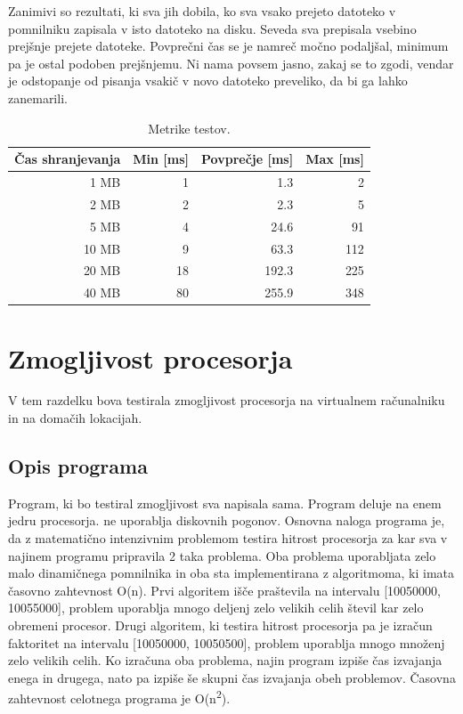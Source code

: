 Zanimivi so rezultati, ki sva jih dobila, ko sva vsako prejeto datoteko v pomnilniku zapisala v isto datoteko na disku. Seveda sva prepisala vsebino prejšnje prejete datoteke. Povprečni čas se je namreč močno podaljšal, minimum pa je ostal podoben prejšnjemu. Ni nama povsem jasno, zakaj se to zgodi, vendar je odstopanje od pisanja vsakič v novo datoteko preveliko, da bi ga lahko zanemarili.

\begin{table}[H]
	\centering
	\begin{tabular}{ | r | r | r | r | }
		\hline
		Čas shranjevanja & Min [ms] & Povprečje [ms] & Max [ms]  \\
		\hline
		1 MB & 1 & 1.3 & 2 \\
		2 MB & 2 & 2.3 & 5 \\
		5 MB & 4 & 24.6 & 91 \\
		10 MB & 9 & 63.3 & 112 \\
		20 MB & 18 & 192.3 & 225 \\
		40 MB & 80 & 255.9 & 348 \\
		\hline
	\end{tabular}
	\caption{Metrike  testov.}
	\label{table:1_chunks}
\end{table}

\section{Zmogljivost procesorja}

V tem razdelku bova testirala zmogljivost procesorja na virtualnem računalniku in na domačih lokacijah.


\subsection{Opis programa}

Program, ki bo testiral zmogljivost sva napisala sama. Program deluje na enem jedru procesorja. ne uporablja diskovnih pogonov.
Osnovna naloga programa je, da z matematično intenzivnim problemom testira hitrost procesorja za kar sva v najinem programu pripravila 2 taka problema. Oba problema uporabljata zelo malo dinamičnega pomnilnika in oba sta implementirana z algoritmoma, ki imata časovno zahtevnost O(n).
Prvi algoritem išče praštevila na intervalu [10050000, 10055000], problem uporablja mnogo deljenj zelo velikih celih števil kar zelo obremeni procesor.
Drugi algoritem, ki testira hitrost procesorja pa je izračun faktoritet na intervalu  [10050000, 10050500], problem uporablja mnogo množenj zelo velikih celih. Ko izračuna oba problema, najin program izpiše čas izvajanja enega in drugega, nato pa izpiše še skupni čas izvajanja obeh problemov.
Časovna zahtevnost celotnega programa je O(n\textsuperscript{2}).

